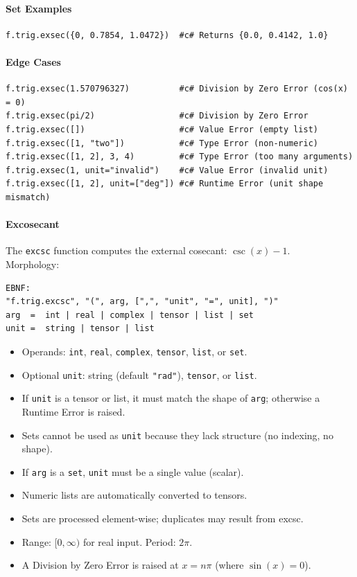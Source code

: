 \paragraph{Set Examples}
\begin{verbatim}
f.trig.exsec({0, 0.7854, 1.0472})  #c# Returns {0.0, 0.4142, 1.0}
\end{verbatim}

\paragraph{Edge Cases}
\begin{verbatim}
f.trig.exsec(1.570796327)          #c# Division by Zero Error (cos(x) = 0)
f.trig.exsec(pi/2)                 #c# Division by Zero Error
f.trig.exsec([])                   #c# Value Error (empty list)
f.trig.exsec([1, "two"])           #c# Type Error (non-numeric)
f.trig.exsec([1, 2], 3, 4)         #c# Type Error (too many arguments)
f.trig.exsec(1, unit="invalid")    #c# Value Error (invalid unit)
f.trig.exsec([1, 2], unit=["deg"]) #c# Runtime Error (unit shape mismatch)
\end{verbatim}

\paragraph{Excosecant}
The \texttt{excsc} function computes the external cosecant: $\csc(x) - 1$.\\
Morphology:
\begin{verbatim}
EBNF:
"f.trig.excsc", "(", arg, [",", "unit", "=", unit], ")"
arg  =  int | real | complex | tensor | list | set
unit =  string | tensor | list
\end{verbatim}
\begin{itemize}
\item Operands: \texttt{int}, \texttt{real}, \texttt{complex}, \texttt{tensor}, \texttt{list}, or \texttt{set}.
\item Optional \texttt{unit}: string (default \texttt{"rad"}), \texttt{tensor}, or \texttt{list}.
\item If \texttt{unit} is a tensor or list, it must match the shape of \texttt{arg}; otherwise a Runtime Error is raised.
\item Sets cannot be used as \texttt{unit} because they lack structure (no indexing, no shape).
\item If \texttt{arg} is a \texttt{set}, \texttt{unit} must be a single value (scalar).
\item Numeric lists are automatically converted to tensors.
\item Sets are processed element-wise; duplicates may result from excsc.
\item Range: $[0, \infty)$ for real input. Period: $2\pi$.
\item A Division by Zero Error is raised at $x = n\pi$ (where $\sin(x) = 0$).
\end{itemize}


